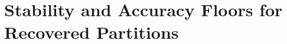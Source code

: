 \documentclass[11pt, letterpaper]{article}
\begin{document}
\section{Stability and Accuracy Floors for Recovered Partitions}\label{sec:uncertainty}
\end{document}
